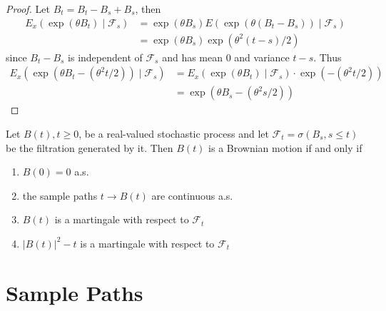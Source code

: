 \begin{proof}
	Let $B_{t}=B_{t}-B_{s}+B_{s}$, then
	\begin{equation*}
		\begin{aligned}
			E_{x}\left(\exp\left(\theta B_{t}\right)\mid\mathcal{F}_{s}\right) & =\exp \left(\theta B_{s}\right)E\left(\exp\left(\theta\left(B_{t}-B_{s}\right)\right)\mid\mathcal{F}_{s}\right) \\
			                                                                   & =\exp\left(\theta B_{s}\right)\exp\left(\theta^{2}(t-s)/2\right)
		\end{aligned}
	\end{equation*}
	since $B_{t}-B_{s}$ is independent of $\mathcal{F}_{s}$ and has mean 0 and variance $t-s$. Thus
	\begin{equation*}
		\begin{aligned}
			E_{x}\left(\exp\left(\theta B_{t}-\left(\theta^{2}t/2\right)\right)\mid\mathcal{F}_{s}\right) & =E_{x}\left(\exp\left(\theta B_{t}\right)\mid\mathcal{F}_{s}\right)\cdot\exp\left(-\left(\theta^{2}t/2\right)\right) \\
			                                                                                              & =\exp\left(\theta B_{s}-\left(\theta^{2}s/2\right)\right)
		\end{aligned}
	\end{equation*}
\end{proof}

\begin{theorem}
	Let $B(t),t\geq 0$, be a real-valued stochastic process and let $\mathcal{F}_{t}=\sigma\left(B_{s},s\leq t\right)$ be the filtration generated by it. Then $B(t)$ is a Brownian motion if and only if
	\begin{enumerate}
		\item $B(0)=0$ a.s.
		\item the sample paths $t\rightarrow B(t)$ are continuous a.s.
		\item $B(t)$ is a martingale with respect to $\mathcal{F}_{t}$
		\item $|B(t)|^{2}-t$ is a martingale with respect to $\mathcal{F}_{t}$
	\end{enumerate}
\end{theorem}

\section{Sample Paths}

